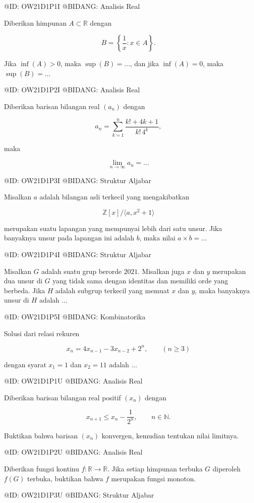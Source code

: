 @ID: OW21D1P1I
@BIDANG: Analisis Real

Diberikan himpunan $A\subset\mathbb R$ dengan

$$
B=\left\{\frac1x:x\in A\right\}.
$$

Jika $\inf(A)>0$, maka $\sup(B)=\ldots$, dan jika $\inf(A)=0$, maka $\sup(B)=\ldots$

@ID: OW21D1P2I
@BIDANG: Analisis Real

Diberikan barisan bilangan real $(a_n)$ dengan

$$
a_n=\sum_{k=1}^{n}\frac{k!+4k+1}{k!\,4^k},
$$

maka

$$
\lim_{n\to\infty}a_n=\ldots
$$

@ID: OW21D1P3I
@BIDANG: Struktur Aljabar

Misalkan $a$ adalah bilangan asli terkecil yang mengakibatkan

$$
\mathbb Z[x]/\langle a,x^2+1\rangle
$$

merupakan suatu lapangan yang mempunyai lebih dari satu unsur. Jika banyaknya unsur pada lapangan ini adalah $b$, maka nilai $a\times b=\ldots$

@ID: OW21D1P4I
@BIDANG: Struktur Aljabar

Misalkan $G$ adalah suatu grup berorde $2021$. Misalkan juga $x$ dan $y$ merupakan dua unsur di $G$ yang tidak sama dengan identitas dan memiliki orde yang berbeda. Jika $H$ adalah subgrup terkecil yang memuat $x$ dan $y$, maka banyaknya unsur di $H$ adalah $\ldots$

@ID: OW21D1P5I
@BIDANG: Kombinatorika

Solusi dari relasi rekuren

$$
x_n=4x_{n-1}-3x_{n-2}+2^n,\qquad (n\ge3)
$$

dengan syarat $x_1=1$ dan $x_2=11$ adalah $\ldots$

@ID: OW21D1P1U
@BIDANG: Analisis Real

Diberikan barisan bilangan real positif $(x_n)$ dengan

$$
x_{n+1}\le x_n-\frac1{2^n},\qquad n\in\mathbb N.
$$

Buktikan bahwa barisan $(x_n)$ konvergen, kemudian tentukan nilai limitnya.

@ID: OW21D1P2U
@BIDANG: Analisis Real

Diberikan fungsi kontinu $f:\mathbb R\to\mathbb R$. Jika setiap himpunan terbuka $G$ diperoleh $f(G)$ terbuka, buktikan bahwa $f$ merupakan fungsi monoton.

@ID: OW21D1P3U
@BIDANG: Struktur Aljabar

